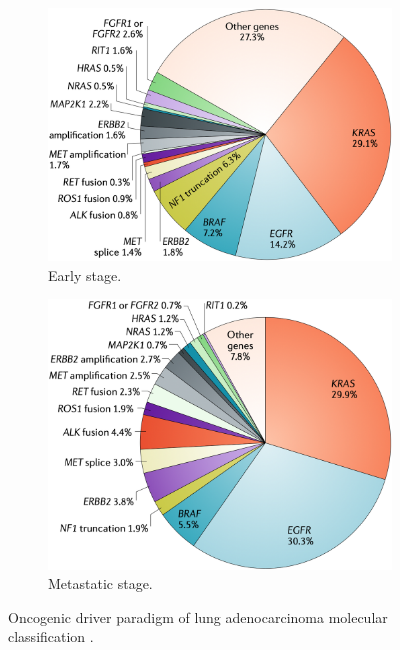 \begin{figure}[ht]
    \centering
    \begin{subfigure}{0.49\textwidth}
        \centering
        \includegraphics[width=\textwidth]{Images/chapter_1/drivers_early.png}
        \caption{Early stage.}
        \label{fig:Drivers_early}
    \end{subfigure}
    \hfill
    \begin{subfigure}{0.49\textwidth}
        \centering
        \includegraphics[width=\textwidth]{Images/chapter_1/drivers_metastasis.png}
        \caption{Metastatic stage.}
        \label{fig:Drivers_metastasis}
    \end{subfigure}
    \caption{Oncogenic driver paradigm of lung adenocarcinoma molecular classification \cite{NSCLC_alterations}.}
    \label{fig:Drivers}
\end{figure}

